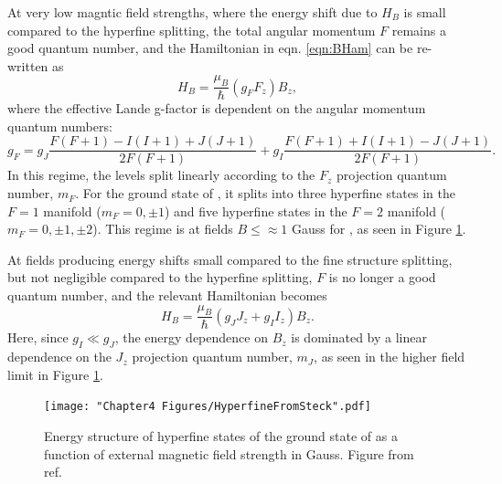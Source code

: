 At very low magntic field strengths, where the energy shift due to $H_B$ is small compared to the hyperfine splitting, the total angular momentum $F$ remains a good quantum number, and the Hamiltonian in eqn. \ref{eqn:BHam} can be re-written as
\begin{equation}
H_B = \frac{\mu_B}{\hbar}(g_F F_z) B_z,
\label{eqn:BHam}
\end{equation}
where the effective Lande g-factor is dependent on the angular momentum quantum numbers:
\begin{equation}
g_F = g_J\frac{F(F+1)-I(I+1)+J(J+1)}{2F(F+1)} + g_I\frac{F(F+1)+I(I+1)-J(J+1)}{2F(F+1)}.
\end{equation}
In this regime, the levels split linearly according to the $F_z$ projection quantum number, $m_F$. For the ground state of \Rb{}, it splits into three hyperfine states in the $F=1$ manifold ($m_F=0,\pm1$) and five hyperfine states in the $F=2$ manifold ($m_F=0,\pm1,\pm2$). This regime is at fields $B\leq\approx1$ Gauss for \Rb{}, as seen in Figure \ref{fig:hyperfineSteck}. 

At fields producing energy shifts small compared to the fine structure splitting, but not negligible compared to the hyperfine splitting, $F$ is no longer a good quantum number, and the relevant Hamiltonian becomes
\begin{equation}
H_B = \frac{\mu_B}{\hbar}(g_J J_z+g_I I_z) B_z.
\end{equation}
Here, since $g_I \ll g_J$, the energy dependence on $B_z$ is dominated by a linear dependence on the $J_z$ projection quantum number, $m_J$, as seen in the higher field limit in Figure \ref{fig:hyperfineSteck}. 

\begin{figure}
	\texttt{[image: "Chapter4 Figures/HyperfineFromSteck".pdf]}
\caption{Energy structure of hyperfine states of the ground state of \Rb{} as a function of external magnetic field strength in Gauss.  Figure from ref. \cite{Steck}}
\label{fig:hyperfineSteck}
\end{figure}

